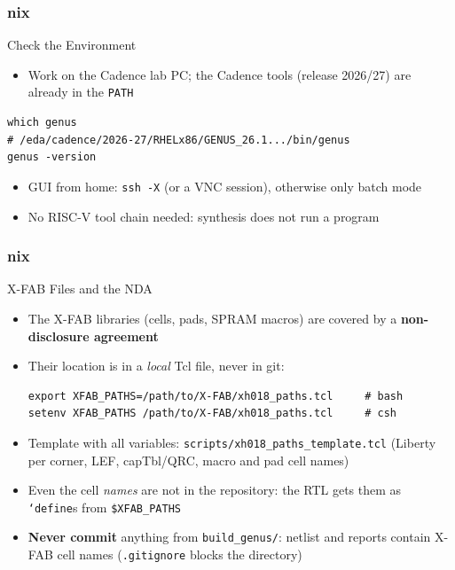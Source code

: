 \documentclass{beamer}
\newcommand{\astitle}{nix}
\newcommand{\assubtitle}{nix}
\newcommand{\cmd}[1]{\texttt{#1}}
\begin{document}
\renewcommand{\assubtitle}{Check the Environment}
\begin{frame}[fragile]
\frametitle{\astitle}
\begin{block}{\assubtitle}
  \begin{itemize}
    \item Work on the Cadence lab PC; the Cadence tools (release 2026/27)
      are already in the \cmd{PATH}
  \end{itemize}
\begin{lstlisting}[style=sh]
which genus
# /eda/cadence/2026-27/RHELx86/GENUS_26.1.../bin/genus
genus -version
\end{lstlisting}
  \begin{itemize}
    \item GUI from home: \cmd{ssh -X} (or a VNC session), otherwise only batch mode
    \item No RISC-V tool chain needed: synthesis does not run a program
  \end{itemize}
\end{block}
\end{frame}

\renewcommand{\assubtitle}{X-FAB Files and the NDA}
\begin{frame}[fragile]
\frametitle{\astitle}
\begin{block}{\assubtitle}
  \footnotesize
  \begin{itemize}
    \item The X-FAB libraries (cells, pads, SPRAM macros) are covered by a
      \textbf{non-disclosure agreement}
    \item Their location is in a \emph{local} Tcl file, never in git:
\begin{lstlisting}[style=sh]
export XFAB_PATHS=/path/to/X-FAB/xh018_paths.tcl     # bash
setenv XFAB_PATHS /path/to/X-FAB/xh018_paths.tcl     # csh
\end{lstlisting}
    \item Template with all variables:
      \cmd{scripts/xh018\_paths\_template.tcl}
      (Liberty per corner, LEF, capTbl/QRC, macro and pad cell names)
    \item Even the cell \emph{names} are not in the repository: the RTL gets them
      as \cmd{`define}s from \cmd{\$XFAB\_PATHS}
    \item \textbf{Never commit} anything from \cmd{build\_genus/}: netlist and
      reports contain X-FAB cell names (\cmd{.gitignore} blocks the directory)
  \end{itemize}
\end{block}
\end{frame}
\end{document}
